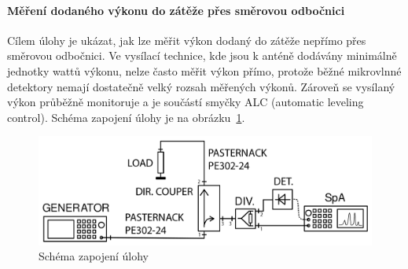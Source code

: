 \documentclass[11pt,a4paper]{article}
\begin{document}
\paragraph*{Měření dodaného výkonu do zátěže přes směrovou odbočnici} Cílem úlohy je ukázat, jak lze měřit výkon dodaný do zátěže nepřímo přes směrovou odbočnici. Ve vysílací technice, kde jsou k anténě dodávány minimálně jednotky wattů výkonu, nelze často měřit výkon přímo, protože běžné mikrovlnné detektory nemají dostatečně velký rozsah měřených výkonů. Zároveň se vysílaný výkon průběžně monitoruje a je součástí smyčky ALC (automatic leveling control). Schéma zapojení úlohy je na obrázku~\ref{fig:task2-zapojeni}.
\begin{figure}[!ht]
    \centering
    \includegraphics[width=.8\textwidth]{src/task2-zapojeni.png}
    \caption{Schéma zapojení úlohy}
    \label{fig:task2-zapojeni}
\end{figure}
\end{document}
